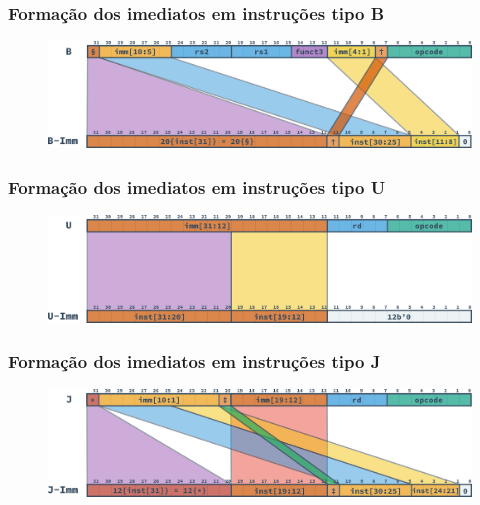 \documentclass[aspectratio=169]{beamer}
\begin{document}
    \begin{frame}
        \frametitle{Formação dos imediatos em instruções tipo \textbf{B}}
        \vfill
        \begin{figure}[H]
        \centering
            \includegraphics[width=.9\textwidth,height=.9\textheight,keepaspectratio]
            {../images/instructions/rv32_b_immediate.png}
        \end{figure}
        \vfill
    \end{frame}

    \begin{frame}
        \frametitle{Formação dos imediatos em instruções tipo \textbf{U}}
        \vfill
        \begin{figure}[H]
        \centering
            \includegraphics[width=.9\textwidth,height=.9\textheight,keepaspectratio]
            {../images/instructions/rv32_u_immediate.png}
        \end{figure}
        \vfill
    \end{frame}

    \begin{frame}
        \frametitle{Formação dos imediatos em instruções tipo \textbf{J}}
        \vfill
        \begin{figure}[H]
        \centering
            \includegraphics[width=.9\textwidth,height=.9\textheight,keepaspectratio]
            {../images/instructions/rv32_j_immediate.png}
        \end{figure}
        \vfill
    \end{frame}
\end{document}
